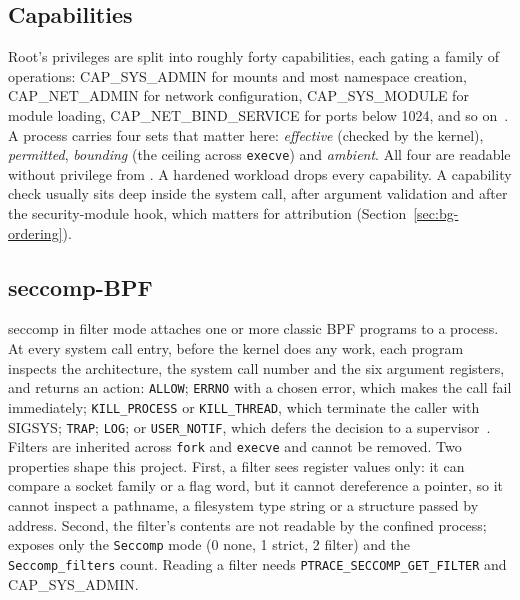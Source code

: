 \subsection{Capabilities}
Root's privileges are split into roughly forty capabilities, each gating a family of operations: CAP\_SYS\_ADMIN for mounts and most namespace creation, CAP\_NET\_ADMIN for network configuration, CAP\_SYS\_MODULE for module loading, CAP\_NET\_BIND\_SERVICE for ports below 1024, and so on~\cite{man-capabilities}. A process carries four sets that matter here: \emph{effective} (checked by the kernel), \emph{permitted}, \emph{bounding} (the ceiling across \texttt{execve}) and \emph{ambient}. All four are readable without privilege from . A hardened workload drops every capability. A capability check usually sits deep inside the system call, after argument validation and after the security-module hook, which matters for attribution (Section~\ref{sec:bg-ordering}).

\subsection{seccomp-BPF}
seccomp in filter mode attaches one or more classic BPF programs to a process. At every system call entry, before the kernel does any work, each program inspects the architecture, the system call number and the six argument registers, and returns an action: \texttt{ALLOW}; \texttt{ERRNO} with a chosen error, which makes the call fail immediately; \texttt{KILL\_PROCESS} or \texttt{KILL\_THREAD}, which terminate the caller with SIGSYS; \texttt{TRAP}; \texttt{LOG}; or \texttt{USER\_NOTIF}, which defers the decision to a supervisor~\cite{man-seccomp}. Filters are inherited across \texttt{fork} and \texttt{execve} and cannot be removed. Two properties shape this project. First, a filter sees register values only: it can compare a socket family or a flag word, but it cannot dereference a pointer, so it cannot inspect a pathname, a filesystem type string or a structure passed by address. Second, the filter's contents are not readable by the confined process;  exposes only the \texttt{Seccomp} mode (0 none, 1 strict, 2 filter) and the \texttt{Seccomp\_filters} count. Reading a filter needs \texttt{PTRACE\_SECCOMP\_GET\_FILTER} and CAP\_SYS\_ADMIN.

